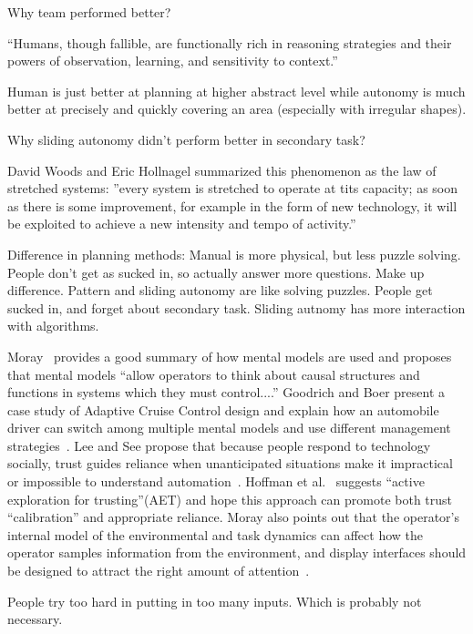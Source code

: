 \documentclass[journal]{IEEEtran}
\begin{document}
Why team performed better?

``Humans, though fallible, are functionally rich in reasoning strategies and their powers of observation, learning, and sensitivity to context.'' ~\cite{Bradshaw2013Seven}

Human is just better at planning at higher abstract level while autonomy is much better at precisely and quickly covering an area (especially with irregular shapes).


Why sliding autonomy didn't perform better in secondary task?

David Woods and Eric Hollnagel summarized this phenomenon as the law of stretched systems: ''every system is stretched to operate at tits capacity; as soon as there is some improvement, for example in the form of new technology, it will be exploited to achieve a new intensity and tempo of activity.''  ~\cite{Woods2006Joint}

Difference in planning methods: 
Manual is more physical, but less puzzle solving. People don't get as sucked in, so actually answer more questions. Make up difference.
Pattern and sliding autonomy are like solving puzzles. People get sucked in, and forget about secondary task.
Sliding autnomy has more interaction with algorithms.


Moray~\cite{Moray1999Mental} provides a good summary of how mental models are used and proposes that mental models ``allow operators to think about causal structures and functions in systems which they must control....'' Goodrich and Boer present a case study of Adaptive Cruise Control design and explain how an automobile driver can switch among multiple mental models and use different management strategies~\cite{Goodrich2002Multiple, Goodrich2003Model}. Lee and See propose that because people respond to technology socially, trust guides reliance when unanticipated situations make it impractical or impossible to understand automation~\cite{Lee2004Trust}. Hoffman et al.\ \cite{Hoffman2013Trust} suggests ``active exploration for trusting''(AET) and hope this approach can promote both trust ``calibration'' and appropriate reliance. Moray also points out that the operator's internal model of the environmental and task dynamics can affect how the operator samples information from the environment, and display interfaces should be designed to attract the right amount of attention~\cite{Moray1990Designing}.

People try too hard in putting in too many inputs. Which is probably not necessary.
\end{document}
